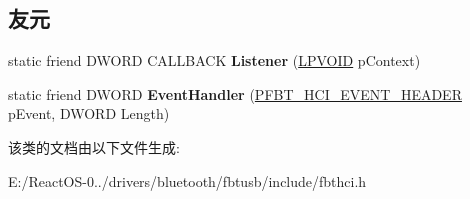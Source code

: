 \subsection*{友元}
\begin{DoxyCompactItemize}
\item 
\mbox{\label{class_c_hci_a3aa7fb8a4530e8f15c775ee43b8703e8}} 
static friend D\+W\+O\+RD C\+A\+L\+L\+B\+A\+CK {\bfseries Listener} (\hyperlink{interfacevoid}{L\+P\+V\+O\+ID} p\+Context)
\item 
\mbox{\label{class_c_hci_ae0d644fa476312d54b6007e725871cfb}} 
static friend D\+W\+O\+RD {\bfseries Event\+Handler} (\hyperlink{struct_f_b_t___h_c_i___e_v_e_n_t___h_e_a_d_e_r}{P\+F\+B\+T\+\_\+\+H\+C\+I\+\_\+\+E\+V\+E\+N\+T\+\_\+\+H\+E\+A\+D\+ER} p\+Event, D\+W\+O\+RD Length)
\end{DoxyCompactItemize}


该类的文档由以下文件生成\+:\begin{DoxyCompactItemize}
\item 
E\+:/\+React\+O\+S-\/0../drivers/bluetooth/fbtusb/include/fbthci.\+h\end{DoxyCompactItemize}
